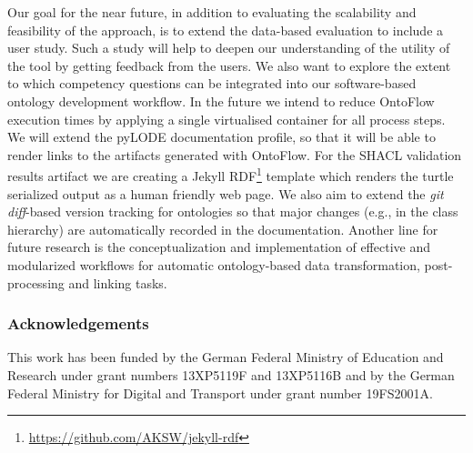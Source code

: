 \documentclass[runningheads]{llncs}
\begin{document}
Our goal for the near future, in addition to evaluating the scalability and feasibility of the approach, is to extend the data-based evaluation to include a user study. Such a study will help to deepen our understanding of the utility of the tool by getting feedback from the users. We also want to explore the extent to which competency questions can be integrated into our software-based ontology development workflow.
In the future we intend to reduce OntoFlow execution times by applying a single virtualised container for all process steps.
We will extend the pyLODE documentation profile, so that it will be able to render links to the artifacts generated with OntoFlow. For the SHACL validation results artifact we are creating a Jekyll RDF\footnote{\url{https://github.com/AKSW/jekyll-rdf}} template which renders the turtle serialized output as a human friendly web page.
We also aim to extend the \textit{git diff}-based version tracking for ontologies so that major changes (e.g., in the class hierarchy) are automatically recorded in the documentation. Another line for future research is the conceptualization and implementation of effective and modularized workflows for automatic ontology-based data transformation, post-processing and linking tasks.

%
%
% 
% 



%
%
\subsubsection*{Acknowledgements}

This work has been funded by the German Federal Ministry of Education and Research under grant numbers 13XP5119F and 13XP5116B and by the German Federal Ministry for Digital and Transport under grant number 19FS2001A.
\end{document}
